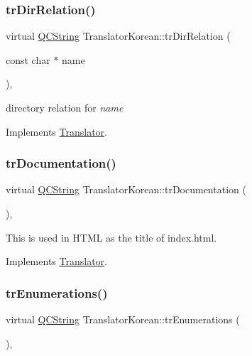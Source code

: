 \subsubsection{\texorpdfstring{trDirRelation()}{trDirRelation()}}
{\footnotesize\ttfamily virtual \mbox{\hyperlink{class_q_c_string}{Q\+C\+String}} Translator\+Korean\+::tr\+Dir\+Relation (\begin{DoxyParamCaption}\item[{const char $\ast$}]{name }\end{DoxyParamCaption})\hspace{0.3cm}{\ttfamily [inline]}, {\ttfamily [virtual]}}

directory relation for {\itshape name} 

Implements \mbox{\hyperlink{class_translator}{Translator}}.

\mbox{\label{class_translator_korean_a7377c2f68dead97b59471d5979a1a940}} 
\subsubsection{\texorpdfstring{trDocumentation()}{trDocumentation()}}
{\footnotesize\ttfamily virtual \mbox{\hyperlink{class_q_c_string}{Q\+C\+String}} Translator\+Korean\+::tr\+Documentation (\begin{DoxyParamCaption}{ }\end{DoxyParamCaption})\hspace{0.3cm}{\ttfamily [inline]}, {\ttfamily [virtual]}}

This is used in H\+T\+ML as the title of index.\+html. 

Implements \mbox{\hyperlink{class_translator}{Translator}}.

\mbox{\label{class_translator_korean_a8ff1d64ea2d3d013f012fc8b26dab587}} 
\subsubsection{\texorpdfstring{trEnumerations()}{trEnumerations()}}
{\footnotesize\ttfamily virtual \mbox{\hyperlink{class_q_c_string}{Q\+C\+String}} Translator\+Korean\+::tr\+Enumerations (\begin{DoxyParamCaption}{ }\end{DoxyParamCaption})\hspace{0.3cm}{\ttfamily [inline]}, {\ttfamily [virtual]}}

